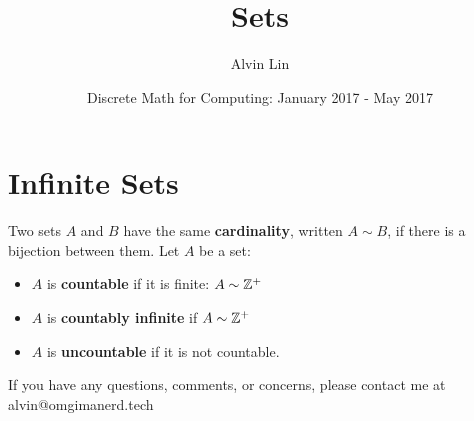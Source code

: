 \documentclass[letterpaper, 12pt]{math}
\title{Sets}
\author{Alvin Lin}
\date{Discrete Math for Computing: January 2017 - May 2017}
\begin{document}
\maketitle

\section*{Infinite Sets}
Two sets \( A \) and \( B \) have the same \textbf{cardinality}, written
\( A\sim B \), if there is a bijection between them.
Let \( A \) be a set:
\begin{itemize}
  \item \( A \) is \textbf{countable} if it is finite: \( A \sim \mathbb{Z}^{+} \)
  \item \( A \) is \textbf{countably infinite} if \( A \sim \mathbb{Z}^{+} \)
  \item \( A \) is \textbf{uncountable} if it is not countable.
\end{itemize}

\begin{center}
  If you have any questions, comments, or concerns, please contact me at
  alvin@omgimanerd.tech
\end{center}
\end{document}

